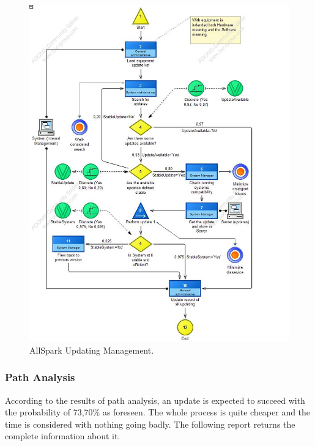 \begin{figure}[ht!]
\begin{centering}
\includegraphics[scale=0.50]{assign2/adonis/imgs/updating.jpg}
\caption{AllSpark Updating Management.}
\label{2img:updating}
\end{centering}
\end{figure}


\subsubsection{Path Analysis}
According to the results of path analysis, an update is expected to succeed with the probability of 73,70\% as foreseen. The whole process is quite cheaper and the time is considered with nothing going badly. The following report returns the complete information about it.

